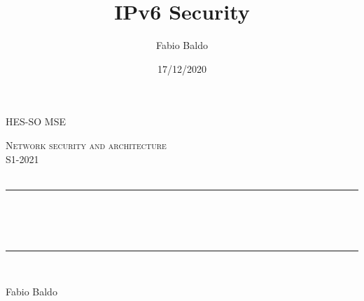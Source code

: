 
\title{IPv6 Security}													%
\author{Fabio Baldo}														%
\date{17/12/2020}														%



\makeatletter
\let\thetitle\@title
\let\theauthor\@author
\let\thedate\@date
\makeatother
\pagestyle{fancy}
\fancyhf{}
\rhead{\theauthor}
\lhead{\thetitle}
\cfoot{\thepage}
\newcommand{\mis}[3]{(#1 \pm #2) \ #3}
\newcommand{\misp}[3]{(#1 \#3 \pm #2}



\begin{titlepage}
	
    \begin{center}				
    \textsc{\LARGE HES-SO MSE}\\[2.0 cm]						%
    
        \vspace*{2.00 cm}
    
	\textsc{\Large Network security and architecture}\\[0.30 cm]		%
	\textsc{\Large S1-2021 }\\[0.5 cm]		%
	\textsc{\Large  }\\[0.5 cm] %
	\rule{\linewidth}{0.2 mm} \\[0.4 cm]
	{ \huge \bfseries \thetitle \\ \small \thedate}\\
	\rule{\linewidth}{0.2 mm} \\[1.5 cm]
	
    	\begin{center}
    	    Fabio Baldo
    	\end{center}
    	
	\end{center}
\end{titlepage}
